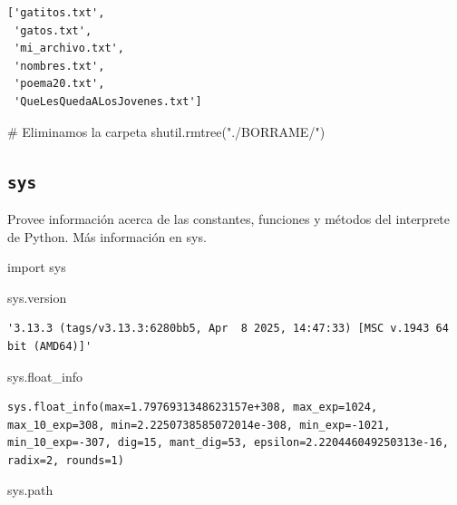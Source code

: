 \documentclass[
  spanish,
  letterpaper,
]{scrbook}
\newenvironment{Shaded}{\begin{snugshade}}{\end{snugshade}}
\newcommand{\CommentTok}[1]{\textcolor[rgb]{0.37,0.37,0.37}{#1}}
\newcommand{\ImportTok}[1]{\textcolor[rgb]{0.00,0.46,0.62}{#1}}
\newcommand{\NormalTok}[1]{\textcolor[rgb]{0.00,0.23,0.31}{#1}}
\newcommand{\StringTok}[1]{\textcolor[rgb]{0.13,0.47,0.30}{#1}}
\theoremstyle{definition}
\theoremstyle{remark}
\begin{document}
\begin{verbatim}
['gatitos.txt',
 'gatos.txt',
 'mi_archivo.txt',
 'nombres.txt',
 'poema20.txt',
 'QueLesQuedaALosJovenes.txt']
\end{verbatim}

\begin{Shaded}
\begin{Highlighting}[]
\CommentTok{\# Eliminamos la carpeta}
\NormalTok{shutil.rmtree(}\StringTok{"./BORRAME/"}\NormalTok{)}
\end{Highlighting}
\end{Shaded}

\subsection{\texorpdfstring{\texttt{sys}}{sys}}\label{sys}

Provee información acerca de las constantes, funciones y métodos del
interprete de Python. Más información en sys.

\begin{Shaded}
\begin{Highlighting}[]
\ImportTok{import}\NormalTok{ sys}
\end{Highlighting}
\end{Shaded}

\begin{Shaded}
\begin{Highlighting}[]
\NormalTok{sys.version}
\end{Highlighting}
\end{Shaded}

\begin{verbatim}
'3.13.3 (tags/v3.13.3:6280bb5, Apr  8 2025, 14:47:33) [MSC v.1943 64 bit (AMD64)]'
\end{verbatim}

\begin{Shaded}
\begin{Highlighting}[]
\NormalTok{sys.float\_info}
\end{Highlighting}
\end{Shaded}

\begin{verbatim}
sys.float_info(max=1.7976931348623157e+308, max_exp=1024, max_10_exp=308, min=2.2250738585072014e-308, min_exp=-1021, min_10_exp=-307, dig=15, mant_dig=53, epsilon=2.220446049250313e-16, radix=2, rounds=1)
\end{verbatim}

\begin{Shaded}
\begin{Highlighting}[]
\NormalTok{sys.path}
\end{Highlighting}
\end{Shaded}
\end{document}
